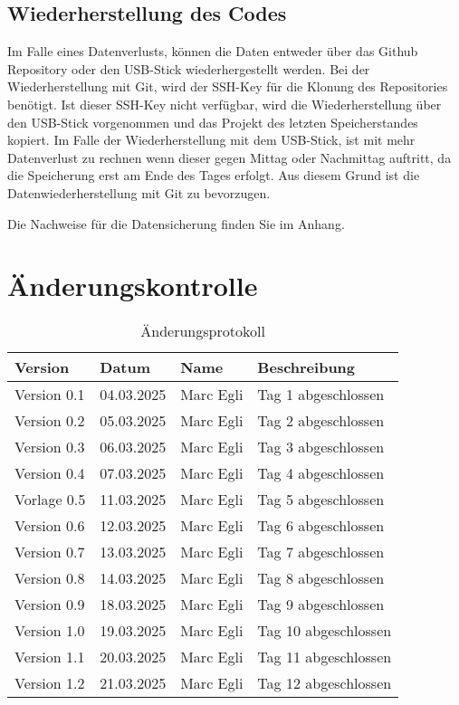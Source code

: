 
\subsection{Wiederherstellung des Codes}
Im Falle eines Datenverlusts, können die Daten entweder über das Github Repository oder den USB-Stick wiederhergestellt werden.
Bei der Wiederherstellung mit Git, wird der SSH-Key für die Klonung des Repositories benötigt. Ist
dieser SSH-Key nicht verfügbar, wird die Wiederherstellung über den USB-Stick vorgenommen und das Projekt des letzten Speicherstandes
kopiert. Im Falle der Wiederherstellung mit dem USB-Stick, ist mit mehr Datenverlust zu rechnen wenn dieser gegen Mittag oder Nachmittag auftritt, da
die Speicherung erst am Ende des Tages erfolgt. Aus diesem Grund ist die Datenwiederherstellung mit Git zu bevorzugen.

Die Nachweise für die Datensicherung finden Sie im Anhang.

\newpage

\section{Änderungskontrolle}
\begin{table}[h!]
    \begin{tabular}{|L{0.2\textwidth}|L{0.2\textwidth}|L{0.2\textwidth}|L{0.3\textwidth}|}
        \color{white}Version & \color{white} Datum & \color{white} Name & \color{white} Beschreibung \\
        \hline
        Version 0.1 & 04.03.2025 &  Marc Egli & Tag 1 abgeschlossen \\
        \hline
        Version 0.2 & 05.03.2025 &  Marc Egli & Tag 2 abgeschlossen \\
        \hline
        Version 0.3 & 06.03.2025 &  Marc Egli & Tag 3 abgeschlossen \\
        \hline
        Version 0.4 & 07.03.2025 &  Marc Egli & Tag 4 abgeschlossen \\
        \hline
        Vorlage 0.5 & 11.03.2025 &  Marc Egli & Tag 5 abgeschlossen \\
        \hline
        Version 0.6 & 12.03.2025 &  Marc Egli & Tag 6 abgeschlossen \\
        \hline
        Version 0.7 & 13.03.2025 &  Marc Egli & Tag 7 abgeschlossen \\
        \hline
        Version 0.8 & 14.03.2025 &  Marc Egli & Tag 8 abgeschlossen \\
        \hline
        Version 0.9 & 18.03.2025 &  Marc Egli & Tag 9 abgeschlossen \\
        \hline
        Version 1.0 & 19.03.2025 &  Marc Egli & Tag 10 abgeschlossen \\
        \hline
        Version 1.1 & 20.03.2025 &  Marc Egli & Tag 11 abgeschlossen \\
        \hline
        Version 1.2 & 21.03.2025 &  Marc Egli & Tag 12 abgeschlossen \\
        \hline
      \end{tabular}
      \caption{Änderungsprotokoll}
 \end{table}

